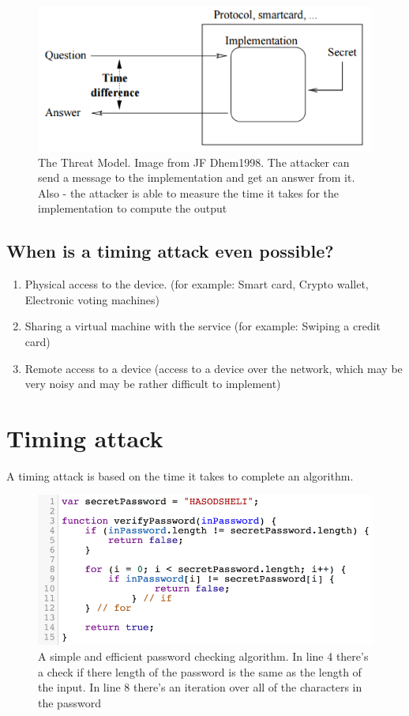 \begin{figure}[H]
    \centering
    \includegraphics{images/chapter_1/threat_model.png}
    \caption{The Threat Model. Image from JF Dhem1998. The attacker can send a
     message to the implementation and get an answer from it. Also - the
     attacker is able to measure the time it takes for the implementation to
     compute the output}
    \label{c1_fig_threat_model}
\end{figure}

\subsection{When is a timing attack even possible?}
\begin{enumerate}
    \item Physical access to the device. (for example: Smart card, Crypto
    wallet, Electronic voting machines)
    \item Sharing a virtual machine with the service (for example: Swiping a
    credit card)
    \item Remote access to a device (access to a device over the network, which
    may be very noisy and may be rather difficult to implement)
\end{enumerate}



\section{Timing attack}
    A timing attack is based on the time it takes to complete an algorithm.


\begin{figure}[H]
    \centering
    \includegraphics{images/chapter_1/password_check_algo_1.png}
    \caption{A simple and efficient password checking algorithm. In line 4
    there's a check if there length of the password is the same as the length of
    the input. In line 8 there's an iteration over all of the characters in the password
    }
    \label{c1_fig_pass_check_1}
\end{figure}

